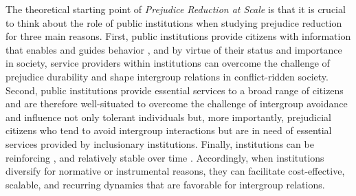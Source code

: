 \documentclass[12pt]{article}
\theoremstyle{plain}
\begin{document}
The theoretical starting point of \emph{Prejudice Reduction at Scale} is that it is crucial to think about the role of public institutions when studying prejudice reduction for three main reasons. First, public institutions provide citizens with information that enables and guides behavior \citep{Greif:2006vz,Posner:2005vn}, and by virtue of their status and importance in society, service providers within institutions can overcome the challenge of prejudice durability and shape intergroup relations in conflict-ridden society. Second, public institutions provide essential services to a broad range of citizens \citep{Pepinsky:2017aa} and are therefore well-situated to overcome the challenge of intergroup avoidance and influence not only tolerant individuals but, more importantly, prejudicial citizens who tend to avoid intergroup interactions but are in need of essential services provided by inclusionary institutions. Finally, institutions can be reinforcing \citep{Greif:2004uz}, and relatively stable over time \citep{Thelen:1999wi}. Accordingly, when institutions diversify for normative or instrumental reasons, they can facilitate cost-effective, scalable, and recurring dynamics that are favorable for intergroup relations. 
\end{document}
